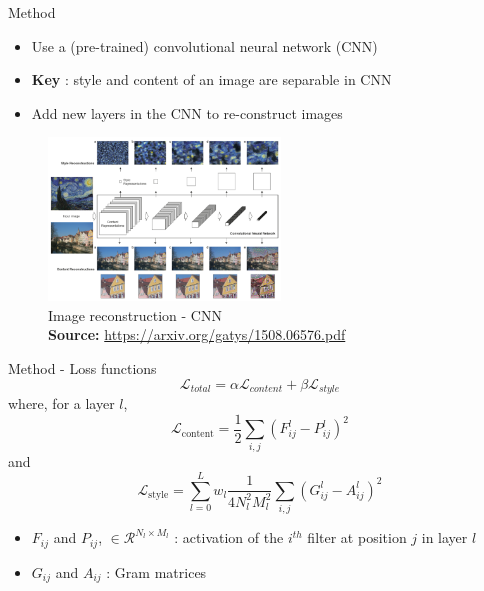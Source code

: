 \documentclass[12pt]{beamer}
\newcommand{\captionsource}[2]{
    \captionsetup{justification=centering}
    \caption*{#1\\\scriptsize\textbf{Source:} \url{#2}}
}
\begin{document}
    \begin{frame}{Method}
        \begin{itemize}
            \item Use a (pre-trained) convolutional neural network (CNN)
            \item {\bf Key} : style and content of an image are separable in CNN
            \item Add new layers in the CNN to re-construct images
        \end{itemize}
        
        \begin{figure}[H]
            \centering
            \includegraphics[width=0.55\textwidth]{resources/gatys/method/image-reconstruction-cnn.png}
            \captionsource{Image reconstruction - CNN}{https://arxiv.org/gatys/1508.06576.pdf}
        \end{figure}
    \end{frame}
    
    \begin{frame}{Method - Loss functions}
        $$\mathcal{L}_{total} = \alpha \mathcal{L}_{content} + \beta \mathcal{L}_{style}$$
        where, for a layer $l$,
        $$\mathcal{L}_{\text {content}} = \frac{1}{2} \sum_{i, j}\left(F_{i j}^{l}-P_{i j}^{l}\right)^{2}$$
        and
        $$\mathcal{L}_{\text {style}} = \sum_{l=0}^{L} w_{l} \frac{1}{4 N_{l}^{2} M_{l}^{2}} \sum_{i, j}\left(G_{i j}^{l}-A_{i j}^{l}\right)^{2}$$
        
        \scriptsize{
            \begin{itemize}
                \item $F_{ij}$ and $P_{ij}$, $\in \mathcal{R}^{N_l\times M_l}$ : activation of the $i^{th}$ filter at position $j$ in layer $l$
                \item $G_{ij}$ and $A_{ij}$ : Gram matrices
            \end{itemize}
        }    
    \end{frame}
    
\end{document}
